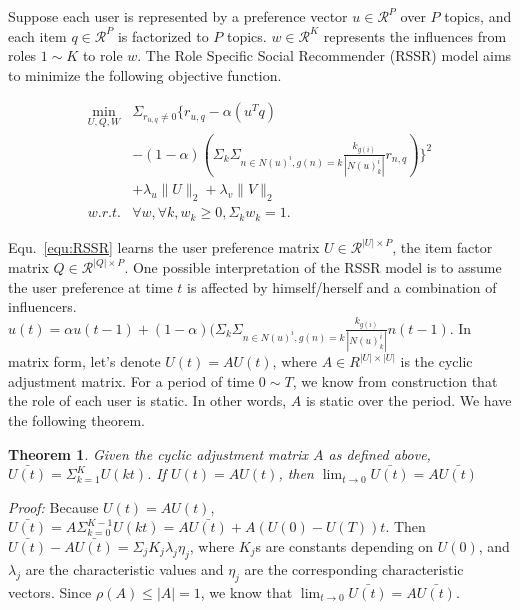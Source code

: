 \documentclass{ieeeaccess}
\newtheorem{myThm}{Theorem}[section]
\begin{document}
Suppose each user is represented by a preference vector $u\in \mathcal{R}^{P}$ over $P$ topics, and each item $q\in \mathcal{R}^{P}$ is factorized to $P$ topics. $w\in \mathcal{R}^{K}$ represents the influences from roles $1\sim K$ to role $w$. The Role Specific Social Recommender (RSSR) model aims to minimize the following objective function.

\begin{equation}
\begin{split}
\min_{U,Q,W} & \Sigma_{r_{u,q}\neq 0}\{r_{u,q}-\alpha(u^T q)\\
&-(1-\alpha)(\Sigma_k \Sigma_{n \in N(u)^i,g(n)=k}\frac{k_{g(i)}}{|N(u)^i_k|} r_{n,q})\}^2 \\
&+\lambda_u\|U\|_2 +\lambda_v \|V\|_2 \\
w.r.t. & \forall w, \forall k, w_{k}\geq 0, \Sigma_k w_{k} =1.
\end{split}
\label{equ:RSSR}
\end{equation}



Equ.~\ref{equ:RSSR} learns the user preference matrix $U\in \mathcal{R}^{|U| \times P}$, the item factor matrix $Q\in \mathcal{R}^{|Q| \times P}$.  One possible interpretation of the RSSR model is to assume the user preference at time $t$ is affected by himself/herself and a combination of influencers. $u(t)=\alpha u(t-1)+(1-\alpha) (\Sigma_k \Sigma_{n \in N(u)^i,g(n)=k}\frac{k_{g(i)}}{|N(u)^i_k|} n(t-1)$. In matrix form, let's denote $U(t)=AU(t)$, where $A \in R^{|U| \times |U|}$ is the cyclic adjustment matrix.  For a period of time $0\sim T$, we know from construction that the role of each user is static.  In other words, $A$ is static over the period. We have the following theorem.

 \begin{myThm}\label{thm:average}
Given the cyclic adjustment matrix $A$ as defined above, $\bar{U(t)}=\Sigma_{k=1}^K U(kt)$. If $U(t)=AU(t)$, then $\lim_{t \rightarrow 0} \bar{U(t)}= A\bar{U(t)}$
 \end{myThm}

\textit{Proof:} Because $U(t)=AU(t)$, $\bar{U(t)}=A \Sigma_{k=0}^{K-1} U(kt) = A \bar{U(t)} + A(U(0) - U(T))t $. Then $\bar{U(t)}-A \bar{U(t)} = \Sigma_jK_j\lambda_j\eta_j$, where $K_j$s are constants depending on $U(0)$, and $\lambda_j$ are the characteristic values and $\eta_j$ are the corresponding characteristic vectors. Since $\rho(A)\leq |A| = 1$, we know that  $\lim_{t \rightarrow 0} \bar{U(t)}= A\bar{U(t)}$.
\end{document}
